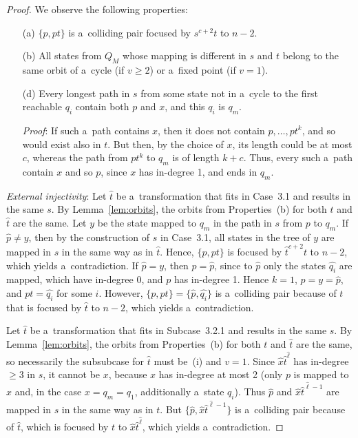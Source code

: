 \documentclass{amsart}
\renewcommand{\ge}{\geqslant}
\newcommand{\e}[1]{\hat{#1}}
\begin{document}
\begin{proof}
We observe the following properties:
\begin{enumerate}
\item[(a)] $\{p, pt\}$ is a~colliding pair focused by $s^{c+2}t$ to $n-2$.

\item[(b)] All states from $Q_M$ whose mapping is different in $s$ and $t$ belong to the same orbit of a~cycle (if $v \ge 2$) or a~fixed point (if $v=1$).

\item[(d)] Every longest path in $s$ from some state not in a~cycle to the first reachable $q_i$ contain both $p$ and $x$, and this $q_i$ is $q_m$.

\textit{Proof}: If such a~path contains $x$, then it does not contain $p,\ldots,pt^k$, and so would exist also in $t$.
But then, by the choice of $x$, its length could be at most $c$, whereas the path from $pt^k$ to $q_m$ is of length $k+c$.
Thus, every such a~path contain $x$ and so $p$, since $x$ has in-degree 1, and ends in $q_m$.
\end{enumerate}

\textit{External injectivity}:
Let $\e{t}$ be a~transformation that fits in Case~3.1 and results in the same $s$.
By Lemma~\ref{lem:orbits}, the orbits from Properties~(b) for both $t$ and $\e{t}$ are the same.
Let $y$ be the state mapped to $q_m$ in the path in $s$ from $p$ to $q_m$.
If $\e{p} \neq y$, then by the construction of $s$ in Case~3.1, all states in the tree of $y$ are mapped in $s$ in the same way as in $\e{t}$.
Hence, $\{p,pt\}$ is focused by $\e{t}^{c+2}t$ to $n-2$, which yields a~contradiction.
If $\e{p} = y$, then $p=\e{p}$, since to $\e{p}$ only the states $\e{q_i}$ are mapped, which have in-degree 0, and $p$ has in-degree 1.
Hence $k=1$, $p=y=\e{p}$, and $pt = \e{q_i}$ for some $i$. However, $\{p,pt\} = \{\e{p},\e{q_i}\}$ is a~colliding pair because of $t$ that is focused by $\e{t}$ to $n-2$, which yields a~contradiction.

Let $\e{t}$ be a~transformation that fits in Subcase~3.2.1 and results in the same $s$.
By Lemma~\ref{lem:orbits}, the orbits from Properties~(b) for both $t$ and $\e{t}$ are the same, so necessarily the subsubcase for $\e{t}$ must be~(i) and $v = 1$.
Since $\e{x}\e{t}^{\e{\ell}}$ has in-degree $\ge 3$ in $s$, it cannot be $x$, because $x$ has in-degree at most 2 (only $p$ is mapped to $x$ and, in the case $x=q_m=q_1$, additionally a~state $q_i$).
Thus $\e{p}$ and $\e{x}\e{t}^{\e{\ell}-1}$ are mapped in $s$ in the same way as in $t$.
But $\{\e{p},\e{x}\e{t}^{\e{\ell}-1}\}$ is a~colliding pair because of $\e{t}$, which is focused by $t$ to $\e{x}\e{t}^{\e{\ell}}$, which yields a~contradiction.


\end{proof}
\end{document}
